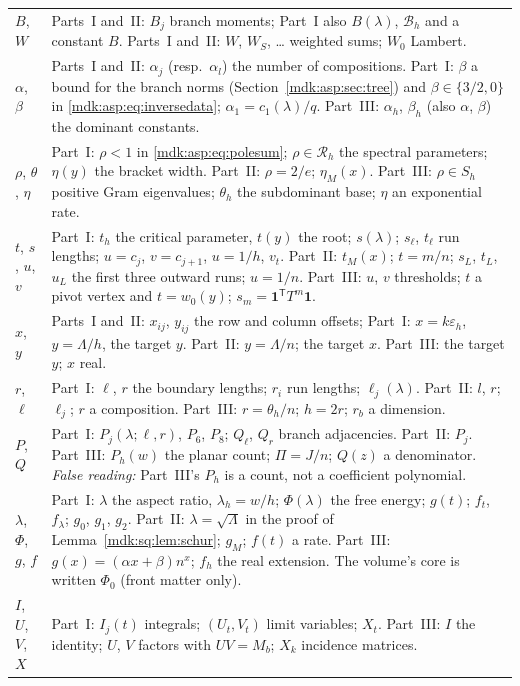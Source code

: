\documentclass[11pt,letterpaper]{article}
\numberwithin{equation}{section}
\theoremstyle{remark}\newtheorem{remark}[theorem]{Remark}
\newcommand{\one}{\mathbf 1}
\begin{document}
\begin{longtable}{@{}>{\raggedright\arraybackslash}p{} >{\raggedright\arraybackslash}p{}@{}}
$B$, $W$ & Parts~I and~II: $B_j$ branch moments; Part~I also $B(\lambda)$, $\mathcal B_h$ and a constant $B$. Parts~I and~II: $W$, $W_S$, \dots{} weighted sums; $W_0$ Lambert.\\
$\alpha$, $\beta$ & Parts~I and~II: $\alpha_j$ (resp.\ $\alpha_l$) the number of compositions. Part~I: $\beta$ a bound for the branch norms (Section~\ref{mdk:asp:sec:tree}) and $\beta\in\{3/2,0\}$ in \eqref{mdk:asp:eq:inversedata}; $\alpha_1=c_1(\lambda)/q$. Part~III: $\alpha_h$, $\beta_h$ (also $\alpha$, $\beta$) the dominant constants.\\
$\rho$, $\theta$, $\eta$ & Part~I: $\rho<1$ in \eqref{mdk:asp:eq:polesum}; $\rho\in\mathcal R_h$ the spectral parameters; $\eta(y)$ the bracket width. Part~II: $\rho=2/e$; $\eta_M(x)$. Part~III: $\rho\in S_h$ positive Gram eigenvalues; $\theta_h$ the subdominant base; $\eta$ an exponential rate.\\
$t$, $s$, $u$, $v$ & Part~I: $t_h$ the critical parameter, $t(y)$ the root; $s(\lambda)$; $s_\ell$, $t_\ell$ run lengths; $u=c_j$, $v=c_{j+1}$, $u=1/h$, $v_t$. Part~II: $t_M(x)$; $t=m/n$; $s_L$, $t_L$, $u_L$ the first three outward runs; $u=1/n$. Part~III: $u$, $v$ thresholds; $t$ a pivot vertex and $t=w_0(y)$; $s_m=\one^{\mathsf T}T^m\one$.\\
$x$, $y$ & Parts~I and~II: $x_{ij}$, $y_{ij}$ the row and column offsets; Part~I: $x=k\varepsilon_h$, $y=\Lambda/h$, the target $y$. Part~II: $y=\Lambda/n$; the target $x$. Part~III: the target $y$; $x$ real.\\
$r$, $\ell$ & Part~I: $\ell$, $r$ the boundary lengths; $r_i$ run lengths; $\ell_j(\lambda)$. Part~II: $l$, $r$; $\ell_j$; $r$ a composition. Part~III: $r=\theta_h/n$; $h=2r$; $r_b$ a dimension.\\
$P$, $Q$ & Part~I: $P_j(\lambda;\ell,r)$, $P_6$, $P_8$; $Q_\ell$, $Q_r$ branch adjacencies. Part~II: $P_j$. Part~III: $P_h(w)$ the planar count; $\Pi=J/n$; $Q(z)$ a denominator. \emph{False reading:} Part~III's $P_h$ is a count, not a coefficient polynomial.\\
$\lambda$, $\Phi$, $g$, $f$ & Part~I: $\lambda$ the aspect ratio, $\lambda_h=w/h$; $\Phi(\lambda)$ the free energy; $g(t)$; $f_t$, $f_\lambda$; $g_0$, $g_1$, $g_2$. Part~II: $\lambda=\sqrt\Lambda$ in the proof of Lemma~\ref{mdk:sq:lem:schur}; $g_M$; $f(t)$ a rate. Part~III: $g(x)=(\alpha x+\beta)n^x$; $f_h$ the real extension. The volume's core is written $\Phi_0$ (front matter only).\\
$I$, $U$, $V$, $X$ & Part~I: $I_j(t)$ integrals; $(U_t,V_t)$ limit variables; $X_t$. Part~III: $I$ the identity; $U$, $V$ factors with $UV=M_b$; $X_k$ incidence matrices.\\
\bottomrule
\end{longtable}
\addtocounter{table}{-1}%
\endgroup
\end{document}

